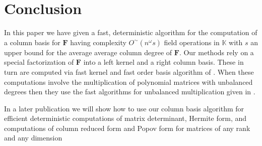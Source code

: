 
\section{Conclusion}

In this paper we have given a fast, deterministic algorithm for the
computation of a column basis for $\mathbf{F}$ having complexity
$O^{\sim}\left(n^{\omega}s\right)$ field operations in $\mathbb{K}$
with $s$ an upper bound for the average average column degree of
$\mathbf{F}$. Our methods rely on a special factorization of $\mathbf{F}$
into a left kernel and a right column basis. These in turn are computed
via fast kernel and fast order basis algorithm of \cite{za2012,ZL2012}.
When these computations involve the multiplication of polynomial matrices
with unbalanced degrees then they use the fast algorithms for unbalanced
multiplication given in \cite{za2012}.


% 
In a later publication we will show how to use our  column basis algorithm for efficient
deterministic computations of matrix determinant, Hermite form, and
computations of column reduced form and Popov form for matrices of
any rank and any dimension